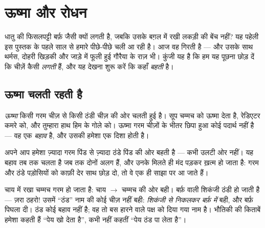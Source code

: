\chapter{ऊष्मा और रोधन}\label{ch:g5:heat-and-insulation}

धातु की फिसलपट्टी बर्फ़ जैसी क्यों लगती है, जबकि उसके बग़ल में रखी
लकड़ी की बेंच नहीं? यह पहेली इस पुस्तक के पहले साल से हमारे पीछे-पीछे
चली आ रही है। आज वह गिरती है --- और उसके साथ थर्मस, दोहरी खिड़की और
जाड़े में फूली हुई गौरैया के राज़ भी। कुंजी यह है कि हम यह पूछना छोड़
दें कि चीज़ें कैसी \emph{लगती} हैं, और यह देखना शुरू करें कि 
कहाँ \emph{बहती} है।

\section{ऊष्मा चलती रहती है}

\begin{definition}[ऊष्मा]\label{def:g5:heat-and-insulation:heat}
\emph{ऊष्मा} किसी गरम चीज़ से किसी ठंडी चीज़ की ओर चलती
हुई  है। सूप चम्मच को ऊष्मा देता है, रेडिएटर कमरे को, और
तुम्हारा हाथ हिम के गोले को। ऊष्मा गरम चीज़ों के भीतर छिपा हुआ कोई
पदार्थ नहीं है --- वह एक \emph{बहाव} है, और उसकी हमेशा एक दिशा होती
है।
\end{definition}

\begin{proposition}[ऊष्मा ढलान से नीचे बहती है]\label{prop:g5:heat-and-insulation:downhill}
अपने आप  हमेशा ज़्यादा गरम पिंड से ज़्यादा ठंडे पिंड की ओर बहती
है --- कभी उलटी ओर नहीं। यह बहाव तब तक चलता है जब तक दोनों  अलग
हैं, और उनके मिलते ही मंद पड़कर ख़त्म हो जाता है: गरम और ठंडे पड़ोसियों
को काफ़ी देर साथ छोड़ दो, तो वे एक ही साझा  पर आ जाते हैं।
\end{proposition}

\begin{example}[दिशा पढ़ना]\label{ex:g5:heat-and-insulation:direction}
चाय में रखा चम्मच गरम हो जाता है:  चाय $\to$ चम्मच की ओर बही।
बर्फ़ वाली शिकंजी ठंडी हो जाती है --- ज़रा ठहरो! उसमें ``ठंड'' नाम की
कोई चीज़ नहीं बही:  \emph{शिकंजी से निकलकर बर्फ़ में} बही, और
बर्फ़ पिघला दी। ठंड कोई बहाव नहीं है; वह तो बस हारने वाले पक्ष को दिया
गया नाम है। भौतिकी की किताबें हमेशा कहती हैं ``पेय  खो देता है'',
कभी नहीं कहतीं ``पेय ठंड पा लेता है''।
\end{example}

